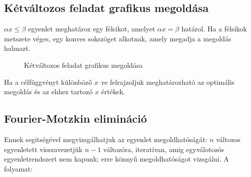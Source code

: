 \subsection{Kétváltozos feladat grafikus megoldása}

$\alpha x \leq \beta$ egyenlet meghatároz egy félsikot, amelyet $\alpha x = \beta$
határol. Ha a félsikok metszete véges, egy konves sokszöget alkotnak, amely megadja a
megoldás halmazt.

\begin{figure}[htbp]
\centering
{}
\caption{Kétváltozos feladat grafikus megoldása} \label{fig:KetValtGraf}
\end{figure}

Ha a célfüggvényt különböző $x$--re felrajzoljuk meghatározható az optimális megoldás és az
ehhez tartozó $x$ értékek.

\subsection{Fourier-Motzkin elimináció}

Ennek segitségével megvizsgálhatjuk az egyenlet megoldhatóságát: $n$ változos egyenletett
visszavezetjük $n-1$ változóra, iteratívan, amig egyválotozós egyenletrendszert nem kapunk;
erre könnyű megoldhatóságot vizsgálni. A folyamat:

